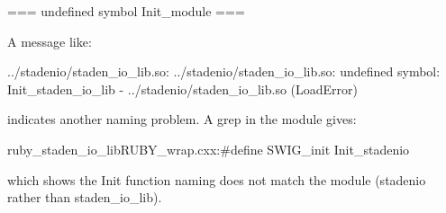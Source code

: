 === undefined symbol Init_module ===

A message like:

  ../stadenio/staden_io_lib.so: ../stadenio/staden_io_lib.so: undefined symbol: Init_staden_io_lib - ../stadenio/staden_io_lib.so (LoadError)

indicates another naming problem. A grep in the module gives:

  ruby_staden_io_libRUBY_wrap.cxx:#define SWIG_init    Init_stadenio

which shows the Init function naming does not match the module
(stadenio rather than staden_io_lib).

